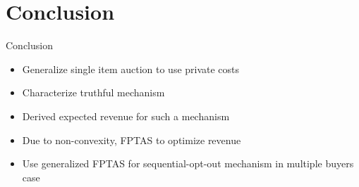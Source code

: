 \documentclass{beamer}
\begin{document}
\section{Conclusion}
\begin{frame}{Conclusion}
  \begin{itemize}
    \item Generalize single item auction to use private costs
    \item Characterize truthful mechanism
    \item Derived expected revenue for such a mechanism
    \item Due to non-convexity, FPTAS to optimize revenue
    \item Use generalized FPTAS for sequential-opt-out mechanism in multiple buyers case
  \end{itemize}
\end{frame}
\end{document}
